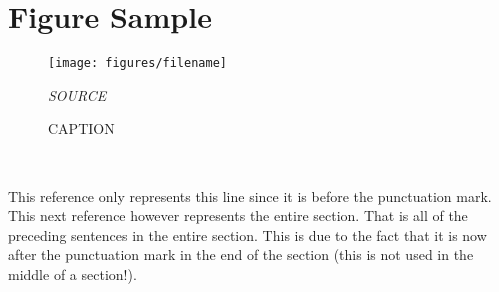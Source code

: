 \section{Figure Sample}

\begin{figure}[H]
	\centering
	\texttt{[image: figures/filename]}
	\flushleft 
	\caption{CAPTION}
	\label{LABEL}
	\flushleft
	\textit{SOURCE}
\end{figure}


\noindent
{}\\

\noindent
{}

\vspace{.5cm}

This reference only represents this line since it is before the punctuation mark\cite{YDing}. This next reference however represents the entire section. That is all of the preceding sentences in the entire section. This is due to the fact that it is now after the punctuation mark in the end of the section (this is not used in the middle of a section!).\cite{YDing}
\pagebreak